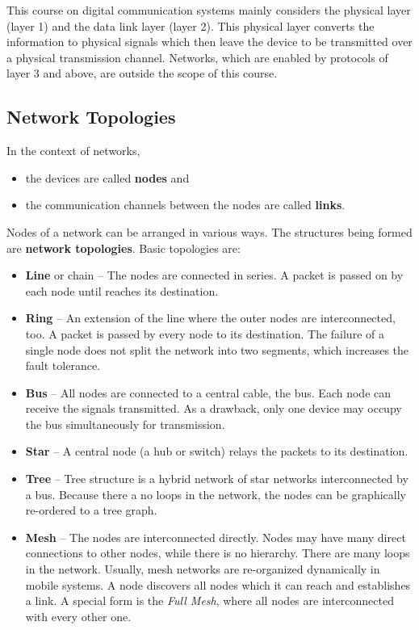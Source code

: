 \begin{refsection}

This course on digital communication systems mainly considers the physical layer (layer 1) and the data link layer (layer 2). This physical layer converts the information to physical signals which then leave the device to be transmitted over a physical transmission channel. Networks, which are enabled by protocols of layer 3 and above, are outside the scope of this course.


\subsection{Network Topologies}

In the context of networks,
\begin{itemize}
	\item the devices are called  \textbf{nodes} and
	\item the communication channels between the nodes are called  \textbf{links}.
\end{itemize}

Nodes of a network can be arranged in various ways. The structures being formed are  \textbf{network topologies}. Basic topologies are:
\begin{itemize}
	\item \textbf{Line} or chain -- The nodes are connected in series. A packet is passed on by each node until reaches its destination.
	\item \textbf{Ring} -- An extension of the line where the outer nodes are interconnected, too. A packet is passed by every node to its destination. The failure of a single node does not split the network into two segments, which increases the fault tolerance.
	\item \textbf{Bus} -- All nodes are connected to a central cable, the bus. Each node can receive the signals transmitted. As a drawback, only one device may occupy the bus simultaneously for transmission.
	\item \textbf{Star} -- A central node (a hub or switch) relays the packets to its destination.
	\item \textbf{Tree} -- Tree structure is a hybrid network of star networks interconnected by a bus. Because there a no loops in the network, the nodes can be graphically re-ordered to a tree graph.
	\item \textbf{Mesh} -- The nodes are interconnected directly. Nodes may have many direct connections to other nodes, while there is no hierarchy. There are many loops in the network. Usually, mesh networks are re-organized dynamically in mobile systems. A node discovers all nodes which it can reach and establishes a link. A special form is the \emph{Full Mesh}, where all nodes are interconnected with every other one.
\end{itemize}


\end{refsection}
